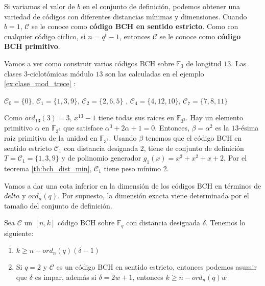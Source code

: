 Si variamos el valor de $b$ en el conjunto de definición, podemos obtener una variedad de códigos con diferentes distancias mínimas y dimensiones. Cuando $b=1$, $\mathcal{C}$ se le conoce como \textbf{código BCH en sentido estricto}. Como con cualquier código cíclico, si $n = q^t-1$, entonces $\mathcal{C}$ se le conoce como \textbf{código BCH primitivo}.

\begin{exampleth}
\label{ex:construir_BCH}
Vamos a ver como construir varios códigos BCH sobre $\mathbb{F}_3$ de longitud $13$. Las clases 3-ciclotómicas módulo $13$ son las calculadas en el ejemplo \ref{ex:clase_mod_trece} :

$\mathcal{C}_0 =  \{ 0 \} $, $\mathcal{C}_1 =  \{1,3,9\} $, $\mathcal{C}_2 =  \{2,6,5\} $ , $\mathcal{C}_4 = \{4,12,10\} $, $\mathcal{C}_7 = \{7,8,11\} $


Como $ord_13(3) = 3$, $x^{13}-1$ tiene todas sus raíces en $\mathbb{F}_{3^3}$. Hay un elemento primitivo $\alpha$ en $\mathbb{F}_{3^3}$ que satisface $\alpha^3 + 2\alpha + 1 = 0$. Entonces, $\beta = \alpha^2$ es la $13$-ésima raíz primitiva de la unidad en $\mathbb{F}_{3^3}$. Usando $\beta$ tenemos que el código BCH en sentido estricto $\mathcal{C}_1$ con distancia designada 2, tiene de conjunto de definición $ T = \mathcal{C}_1 = \{ 1,3,9 \}$ y de polinomio generador $g_1(x) = x^3 + x^2 +x +2$. Por el teorema \ref{th:bch_dist_min}, $\mathcal{C}_1$ tiene peso mínimo 2.

\end{exampleth}


Vamos a dar una cota inferior en la dimensión de los códigos BCH en términos de $delta$ y $ord_n(q)$. Por supuesto, la dimensión exacta viene determinada por el tamaño del conjunto de definición.

\begin{theorem}
Sea  $\mathcal{C}$ un $[n,k]$ código BCH sobre $\mathbb{F}_q$ con distancia designada $\delta$. Tenemos lo siguiente:
\begin{enumerate}
	\item $ k \geq n - ord_n(q)(\delta -1)$
	\item Si $q = 2$ y $\mathcal{C}$ es un código BCH en sentido estricto, entonces podemos asumir que $\delta$ es impar, además si $\delta = 2w+1$, entonces $ k \geq n - ord_n(q)w$
\end{enumerate}
\end{theorem}

